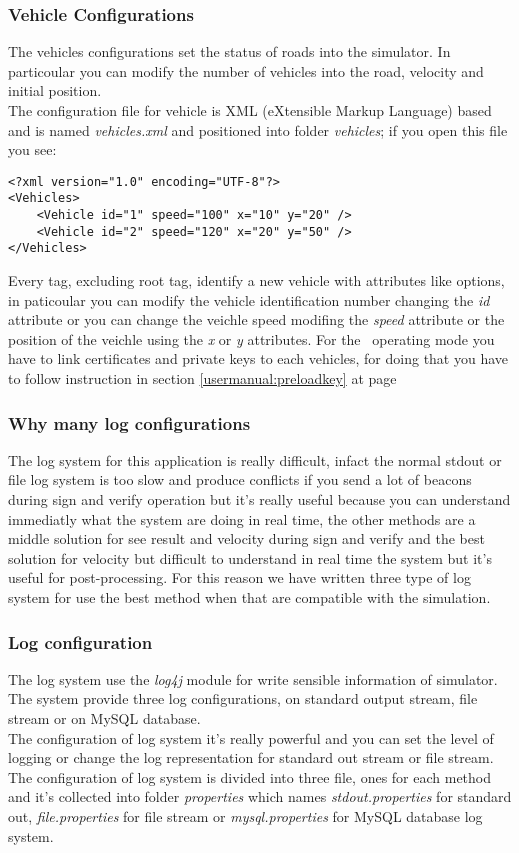 \subsubsection{Vehicle Configurations}\label{usermanual:vehicleconfigurations}
The vehicles configurations set the status of roads into the simulator. In particoular you can modify the number of vehicles into the road, velocity and initial position.\\
The configuration file for vehicle is XML (eXtensible Markup Language) based and is named \textit{vehicles.xml} and positioned into folder \textit{vehicles}; if you open this file you see:
\begin{verbatim}
<?xml version="1.0" encoding="UTF-8"?>
<Vehicles>
    <Vehicle id="1" speed="100" x="10" y="20" />
    <Vehicle id="2" speed="120" x="20" y="50" />
</Vehicles>
\end{verbatim}
Every tag, excluding root tag, identify a new vehicle with attributes like options, in paticoular you can modify the vehicle identification number changing the \textit{id} attribute or you can change the veichle speed modifing the \textit{speed} attribute or the position of the veichle using the \textit{x} or \textit{y} attributes.
For the \baseline~operating mode you have to link certificates and private keys to each vehicles, for doing that you have to follow instruction in section \ref{usermanual:preloadkey} at page \pageref{usermanual:preloadkey}
\subsubsection{Why many log configurations}
The log system for this application is really difficult, infact the normal stdout or file log system is too slow and produce conflicts if you send a lot of beacons during sign and verify operation but it's really useful because you can understand immediatly what the system are doing in real time, the other methods are a middle solution for see result and velocity during sign and verify and the best solution for velocity but difficult to understand in real time the system but it's useful for post-processing. For this reason we have written three type of log system for use the best method when that are compatible with the simulation.
\subsubsection{Log configuration}\label{usermanual:logconfiguration}
The log system use the \textit{log4j} module for write sensible information of simulator. The system provide three log configurations, on standard output stream, file stream or on MySQL database.\\
The configuration of log system it's really powerful and you can set the level of logging or change the log representation for standard out stream or file stream. The configuration of log system is divided into three file, ones for each method and it's collected into folder \textit{properties} which names \textit{stdout.properties} for standard out, \textit{file.properties} for file stream or \textit{mysql.properties} for MySQL database log system.
